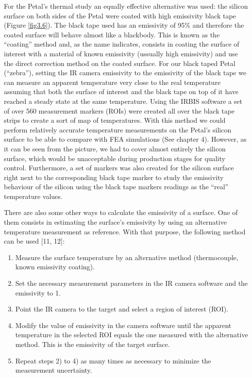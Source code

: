 			For the Petal's thermal study an equally effective alternative was used: the silicon surface on both sides of the Petal were coated with high emissivity black tape (Figure \ref{fig3.6}). The black tape used has an emissivity of 95\% and therefore the coated surface will behave almost like a blackbody. This is known as the “coating” method and, as the name indicates, consists in coating the surface of interest with a material of known emissivity (ussually high emissivity) and use the direct correction method on the coated surface. 
			For our black taped Petal (“zebra”), setting the IR camera emissivity to the emissivity of the black tape we can measure an apparent temperature very close to the real temperature assuming that both the surface of interest and the black tape on top of it have reached a steady state at the same temperature. Using the IRBIS software a set of over 560 measurement markers (ROIs) were created all over the black tape strips to create a sort of map of temperatures. With this method we could perform relatively accurate temperature measurements on the Petal's silicon surface to be able to compare with FEA simulations (See chapter 4). However, as it can be seen from the picture, we had to cover almost entirely the silicon surface, which would be unacceptable during production stages for quality control. Furthermore, a set of markers was also created for the silicon surface right next to the corresponding black tape marker to study the emissivity behaviour of the silicon using the black tape markers readings as the “real” temperature values.
			
			\bigskip
			There are also some other ways to calculate the emissivity of a surface. One of them consists in estimating the surface’s emissivity by using an alternative temperature measurement as reference. With that purpose, the following method can be used [11, 12]:	
			
			\begin{enumerate}[label={\arabic*)}]
				\item Measure the surface temperature by an alternative method (thermocouple, known emissivity coating).
				\item Set the necessary measurement parameters in the IR camera software and the emissivity to 1.
				\item Point the IR camera to the target and select a region of interest (ROI).
				\item Modify the value of emissivity in the camera software until the apparent temperature in the selected ROI equals the one measured with the alternative method. This is the emissivity of the target surface.
				\item Repeat steps 2) to 4) as many times as necessary to minimize the measurement uncertainty.
			\end{enumerate}	
			
